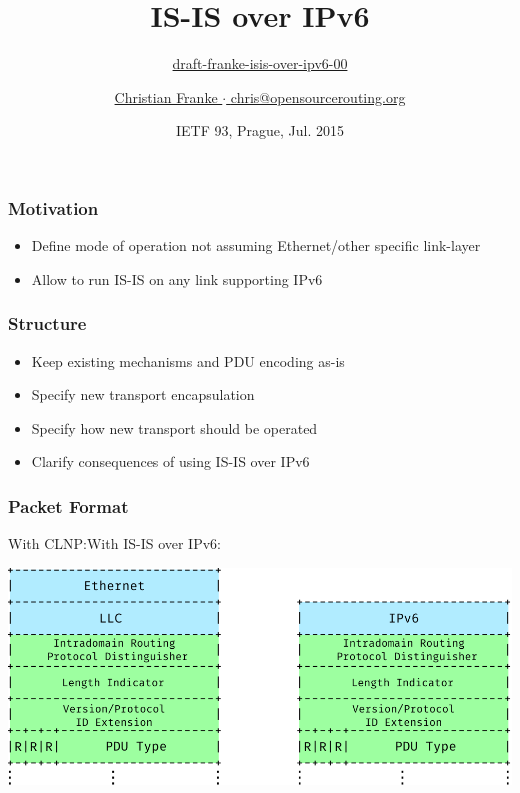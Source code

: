 \documentclass[12pt]{beamer}
\title{IS-IS over IPv6}
\subtitle{%
  \href{https://datatracker.ietf.org/doc/draft-franke-isis-over-ipv6/}{draft-franke-isis-over-ipv6-00}
}
\author{%
	\underline{Christian Franke $\cdot$ \href{mailto:chris@opensourcerouting.org}{chris@opensourcerouting.org}}
}
\date{IETF 93, Prague, Jul. 2015}
\begin{document}
\begin{frame}
  \titlepage
\end{frame}

\begin{frame}
  \frametitle{Motivation}
  \begin{itemize}
    \item \Large Define mode of operation not assuming Ethernet/other specific link-layer
    \item \Large Allow to run IS-IS on any link supporting IPv6
  \end{itemize}
\end{frame}

\begin{frame}
  \frametitle{Structure}
  \begin{itemize}
    \item \Large Keep existing mechanisms and PDU encoding as-is
    \item \Large Specify new transport encapsulation
    \item \Large Specify how new transport should be operated
    \item \Large Clarify consequences of using IS-IS over IPv6
  \end{itemize}
\end{frame}

\begin{frame}
  \frametitle{Packet Format}
  \hspace{13mm}With CLNP:\hspace{32mm}With IS-IS over IPv6:%

  \vspace{5mm}%
    \includegraphics[scale=0.65,angle=0]{isis_ipv6_format-00.pdf}
\end{frame}
\end{document}
